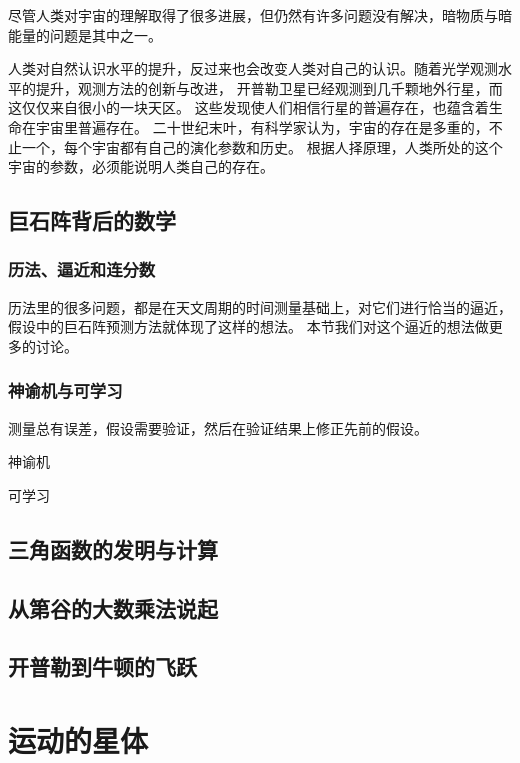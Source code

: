 \documentclass[a4paper,10.5pt]{book}
\begin{document}
尽管人类对宇宙的理解取得了很多进展，但仍然有许多问题没有解决，暗物质与暗能量的问题是其中之一。

人类对自然认识水平的提升，反过来也会改变人类对自己的认识。随着光学观测水平的提升，观测方法的创新与改进，
开普勒卫星已经观测到几千颗地外行星，而这仅仅来自很小的一块天区。
这些发现使人们相信行星的普遍存在，也蕴含着生命在宇宙里普遍存在。
二十世纪末叶，有科学家认为，宇宙的存在是多重的，不止一个，每个宇宙都有自己的演化参数和历史。
根据人择原理，人类所处的这个宇宙的参数，必须能说明人类自己的存在。

\section{巨石阵背后的数学}

\subsection{历法、逼近和连分数}

历法里的很多问题，都是在天文周期的时间测量基础上，对它们进行恰当的逼近，假设中的巨石阵预测方法就体现了这样的想法。
本节我们对这个逼近的想法做更多的讨论。

\subsection{神谕机与可学习}

测量总有误差，假设需要验证，然后在验证结果上修正先前的假设。

神谕机

可学习

\section{三角函数的发明与计算}

\section{从第谷的大数乘法说起}

\section{开普勒到牛顿的飞跃}




\chapter{运动的星体}
\end{document}
